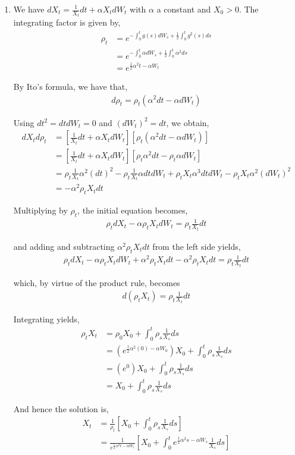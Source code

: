 \documentclass[12pt]{article}
\begin{document}
\begin{enumerate}[\alph*)]
\item We have $dX_t = \frac{1}{X_t} dt + \alpha X_t dW_t$ with $\alpha$ a constant and $X_0 > 0$. The integrating factor is given by,
\begin{align*}
\rho_t &= e^{-\int_0^t g(s) dW_s + \frac{1}{2}\int_0^t g^2(s) ds}\\
&= e^{-\int_0^t \alpha dW_s + \frac{1}{2}\int_0^t \alpha^2 ds}\\
&= e^{\frac{1}{2} \alpha^2t - \alpha W_t}
\end{align*}

By Ito's formula, we have that,
\begin{align*}
d\rho_t = \rho_t(\alpha^2 dt - \alpha dW_t)
\end{align*}

Using $dt^2 = dt dW_t = 0$ and $(dW_t)^2 = dt$, we obtain,
\begin{align*}
dX_td\rho_t &= [\frac{1}{X_t}dt + \alpha X_t dW_t][\rho_t(\alpha^2 dt - \alpha dW_t)]\\
&= [\frac{1}{X_t}dt + \alpha X_t dW_t][\rho_t \alpha^2 dt - \rho_t \alpha dW_t]\\
&=  \rho_t \frac{1}{X_t} \alpha^2 (dt)^2 - \rho_t \frac{1}{X_t} \alpha dt dW_t + \rho_t X_t \alpha^3 dt dW_t - \rho_t X_t \alpha^2 (dW_t)^2\\
&= - \alpha^2 \rho_t X_t dt
\end{align*}

Multiplying by $\rho_t$, the initial equation becomes,
\begin{align*}
\rho_tdX_t - \alpha\rho_tX_tdW_t = \rho_t \frac{1}{X_t} dt
\end{align*}

and adding and subtracting $\alpha^2\rho_tX_tdt$ from the left side yields,
\begin{align*}
\rho_tdX_t - \alpha\rho_tX_tdW_t + \alpha^2\rho_tX_tdt - \alpha^2\rho_tX_tdt = \rho_t \frac{1}{X_t} dt
\end{align*}

which, by virtue of the product rule, becomes
\begin{align*}
d(\rho_tX_t) = \rho_t \frac{1}{X_t} dt
\end{align*}

Integrating yields,
\begin{align*}
\rho_tX_t &= \rho_0X_0 + \int_0^t \rho_s \frac{1}{X_s} ds\\
&= (e^{\frac{1}{2} \alpha^2(0) - \alpha W_0})X_0 + \int_0^t \rho_s \frac{1}{X_s} ds\\
&= (e^0)X_0 + \int_0^t \rho_s \frac{1}{X_s} ds\\
&= X_0 + \int_0^t \rho_s \frac{1}{X_s} ds
\end{align*}

And hence the solution is,
\begin{align*}
X_t &= \frac{1}{\rho_t} \left[X_0 + \int_0^t \rho_s \frac{1}{X_s} ds\right]\\
&= \frac{1}{ e^{\frac{1}{2} \alpha^2t - \alpha W_t}} \left[X_0 + \int_0^t  e^{\frac{1}{2} \alpha^2s - \alpha W_s} \frac{1}{X_s} ds\right]
\end{align*}

\end{enumerate}
\end{document}
